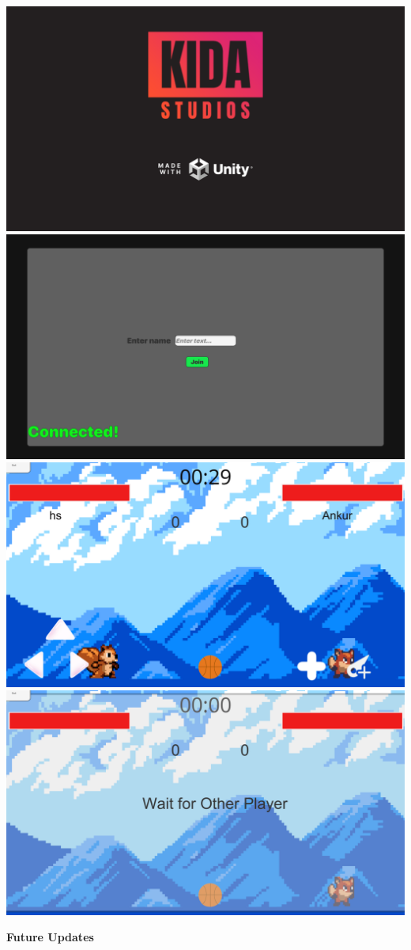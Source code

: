 \documentclass[12pt]{report}
\begin{document}
\begin{center}
\includegraphics[scale=0.2]{image20.png}
\label{Game UI}
\includegraphics[scale=0.2]{image21.png}
\includegraphics[scale=0.2]{image22.png}
\includegraphics[scale=0.2]{image23.png}
\end{center}
\newpage
\textbf{Future Updates}
\end{document}
